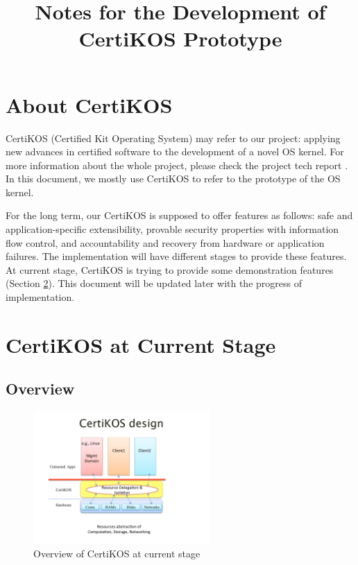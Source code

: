 \documentclass[a4paper,12pt]{article}
\begin{document}
\title{ Notes for the Development of CertiKOS Prototype }
\maketitle

\tableofcontents

\newpage
\section{About CertiKOS }

CertiKOS (Certified Kit Operating System) may refer to our project: applying new advances
in certified software \cite{certifiedsoftware} to the development of a novel OS kernel. For more information about the whole project, please check  the project tech report \cite{CertiKOSReport}. In this document, we mostly use CertiKOS to refer to the prototype of the OS kernel. 

For the long term,  our CertiKOS is supposed to offer features as follows: safe and application-specific extensibility, provable security properties with information flow control, and accountability and recovery from hardware or application failures. The implementation will have different stages to provide these features. At current stage, CertiKOS is trying to provide some demonstration features (Section \ref{sec:currentstage}). This document will be updated later with the progress of implementation.


\section{CertiKOS at Current Stage}
\label{sec:currentstage}


\subsection{Overview}
\begin{figure}[!ht]
 \centerline{
 \includegraphics[width=0.6\textwidth]{overview.pdf}}
 \caption{Overview of CertiKOS at current stage} \label{fig:overview}
\end{figure}
\end{document}
